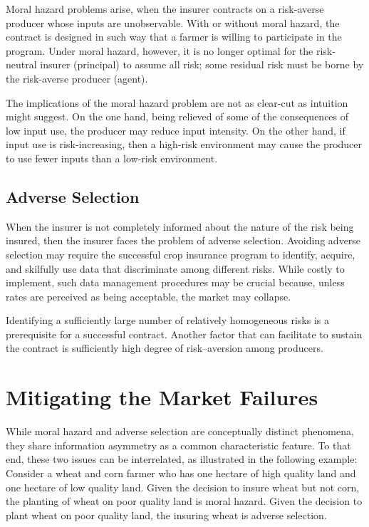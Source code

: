 \documentclass[
  oneside]{book}
\begin{document}
Moral hazard problems arise, when the insurer contracts on a risk-averse producer whose inputs are unobservable. With or without moral hazard, the contract is designed in such way that a farmer is willing to participate in the program. Under moral hazard, however, it is no longer optimal for the risk-neutral insurer (principal) to assume all risk; some residual risk must be borne by the risk-averse producer (agent).

The implications of the moral hazard problem are not as clear-cut as intuition might suggest. On the one hand, being relieved of some of the consequences of low input use, the producer may reduce input intensity. On the other hand, if input use is risk-increasing, then a high-risk environment may cause the producer to use fewer inputs than a low-risk environment.

\hypertarget{adverse-selection}{%
\subsection{Adverse Selection}\label{adverse-selection}}

When the insurer is not completely informed about the nature of the risk being insured, then the insurer faces the problem of adverse selection. Avoiding adverse selection may require the successful crop insurance program to identify, acquire, and skilfully use data that discriminate among different risks. While costly to implement, such data management procedures may be crucial because, unless rates are perceived as being acceptable, the market may collapse.

Identifying a sufficiently large number of relatively homogeneous risks is a prerequisite for a successful contract. Another factor that can facilitate to sustain the contract is sufficiently high degree of risk--aversion among producers.

\hypertarget{mitigating-the-market-failures}{%
\section{Mitigating the Market Failures}\label{mitigating-the-market-failures}}

While moral hazard and adverse selection are conceptually distinct phenomena, they share information asymmetry as a common characteristic feature. To that end, these two issues can be interrelated, as illustrated in the following example: Consider a wheat and corn farmer who has one hectare of high quality land and one hectare of low quality land. Given the decision to insure wheat but not corn, the planting of wheat on poor quality land is moral hazard. Given the decision to plant wheat on poor quality land, the insuring wheat is adverse selection.
\end{document}
